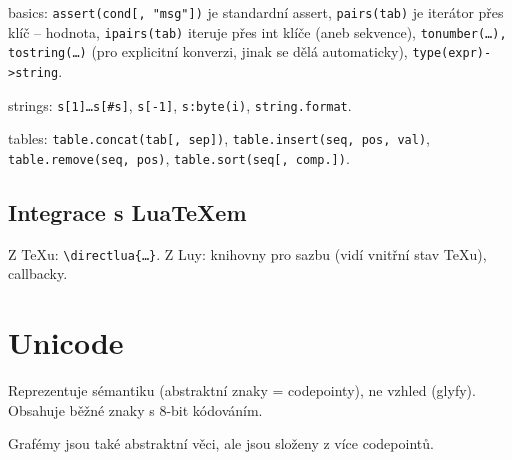 \documentclass[12pt]{article}					%
\begin{document}
        \begin{definice}[Knihovny]
            basics: \verb|assert(cond[, "msg"])| je standardní assert, \verb|pairs(tab)| je iterátor přes klíč -- hodnota, \verb|ipairs(tab)| iteruje přes int klíče (aneb sekvence), \verb|tonumber(…), tostring(…)| (pro explicitní konverzi, jinak se dělá automaticky), \verb|type(expr)->string|.

            strings: \verb|s[1]…s[#s]|, \verb|s[-1]|, \verb|s:byte(i)|, \verb|string.format|.

            tables: \verb|table.concat(tab[, sep])|, \verb|table.insert(seq, pos, val)|, \verb|table.remove(seq, pos)|, \verb|table.sort(seq[, comp.])|.
        \end{definice}

    \subsection{Integrace s LuaTeXem}
        \begin{poznamka}
            Z TeXu: \verb|\directlua{…}|. Z Luy: knihovny pro sazbu (vidí vnitřní stav TeXu), callbacky.
        \end{poznamka}


\section{Unicode}
    \begin{definice}
        Reprezentuje sémantiku (abstraktní znaky = codepointy), ne vzhled (glyfy). Obsahuje běžné znaky s 8-bit kódováním.

        Grafémy jsou také abstraktní věci, ale jsou složeny z více codepointů.
    \end{definice}
\end{document}
